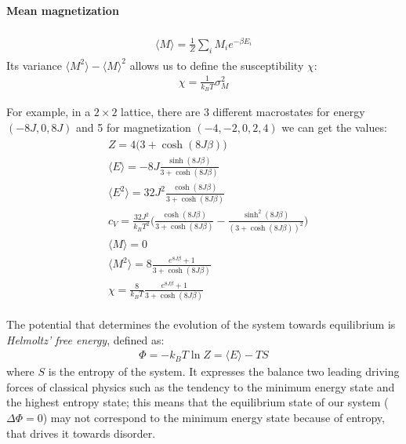 \documentclass[%
 reprint,
 amsmath,amssymb,
 aps,
]{revtex4-1}
\theoremstyle{plain}
\theoremstyle{definition}
\theoremstyle{plain}
\newcommand{\mean}[1]{\langle #1\rangle}
\begin{document}
	\paragraph*{\textbf{Mean magnetization}}
	\begin{align*}
	\begin{split}
	\mean{M}=\frac{1}{Z}\sum_i M_ie^{-\beta E_i}
	\end{split}
	\end{align*}
	Its variance $\mean{M^2}-\mean{M}^2$ allows us to define the susceptibility $\chi$:
	\begin{align*}
	\chi=\frac{1}{k_BT}\sigma_M^2
	\end{align*}
	
	For example, in a $2\times 2$ lattice, there are 3 different macrostates for energy $(-8J,0,8J)$ and 5 for magnetization $(-4,-2,0,2,4)$ \cite{compnotes} we can get the values:
	\begin{align}
		\label{EValsModel}
		\begin{split}
		&Z = 4\big(3 + \cosh(8J\beta)\big)\\
		&\mean{E} = -8J\frac{\sinh(8J\beta)}{3 + \cosh(8J\beta)}\\
		&\mean{E^2} = 32J^2\frac{\cosh(8J\beta)}{3 + \cosh(8J\beta)}\\
		&c_V= \frac{32J^2}{k_BT^2}\bigg( \frac{\cosh(8J\beta)}{3 + \cosh(8J\beta)} - \frac{\sinh^2(8J\beta)}{(3 + \cosh(8J\beta))^2}\bigg)\\
		&\mean{M} = 0\\
		&\mean{M^2} = 8\frac{e^{8J\beta}+1}{3 + \cosh(8J\beta)} \\
		&\chi = \frac{8}{k_BT}\frac{e^{8J\beta}+1}{3 + \cosh(8J\beta)}
		\end{split}
	\end{align}

	The potential that determines the evolution of the system towards equilibrium is \textit{Helmoltz' free energy}, defined as:
	\begin{align*}
	\Phi = -k_BT\ln Z = \mean{E} - TS
	\end{align*}
	where $S$ is the entropy of the system.
	It expresses the balance two leading driving forces of classical physics such as the tendency to the minimum energy state and the highest entropy state; this means that the equilibrium state of our system ($\Delta\Phi=0$) may not correspond to the minimum energy state because of entropy, that drives it towards disorder.\\
	
\end{document}
